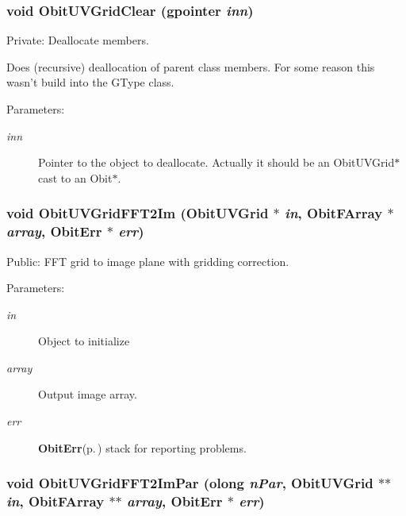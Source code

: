 \subsubsection{\setlength{\rightskip}{0pt plus 5cm}void Obit\-UVGrid\-Clear (gpointer {\em inn})}\label{ObitUVGrid_8c_a6}


Private: Deallocate members. 

Does (recursive) deallocation of parent class members. For some reason this wasn't build into the GType class. \begin{Desc}
\item[Parameters:]
\begin{description}
\item[{\em inn}]Pointer to the object to deallocate. Actually it should be an Obit\-UVGrid$\ast$ cast to an Obit$\ast$. \end{description}
\end{Desc}
\subsubsection{\setlength{\rightskip}{0pt plus 5cm}void Obit\-UVGrid\-FFT2Im ({\bf Obit\-UVGrid} $\ast$ {\em in}, {\bf Obit\-FArray} $\ast$ {\em array}, {\bf Obit\-Err} $\ast$ {\em err})}\label{ObitUVGrid_8c_a21}


Public: FFT grid to image plane with gridding correction. 

\begin{Desc}
\item[Parameters:]
\begin{description}
\item[{\em in}]Object to initialize \item[{\em array}]Output image array. \item[{\em err}]{\bf Obit\-Err}{\rm (p.\,\pageref{structObitErr})} stack for reporting problems. \end{description}
\end{Desc}
\subsubsection{\setlength{\rightskip}{0pt plus 5cm}void Obit\-UVGrid\-FFT2Im\-Par ({\bf olong} {\em n\-Par}, {\bf Obit\-UVGrid} $\ast$$\ast$ {\em in}, {\bf Obit\-FArray} $\ast$$\ast$ {\em array}, {\bf Obit\-Err} $\ast$ {\em err})}\label{ObitUVGrid_8c_a22}


